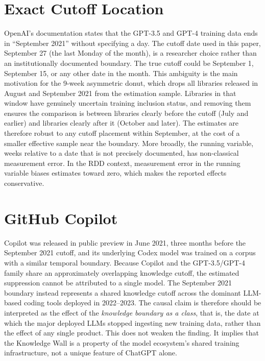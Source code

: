 \documentclass[12pt, a4paper]{report}
\begin{document}
\section*{Exact Cutoff Location}
OpenAI's documentation states that the GPT-3.5 and GPT-4 training data ends in ``September 2021'' without specifying a day. The cutoff date used in this paper, September 27 (the last Monday of the month), is a researcher choice rather than an institutionally documented boundary. The true cutoff could be September 1, September 15, or any other date in the month. This ambiguity is the main motivation for the 9-week asymmetric donut, which drops all libraries released in August and September 2021 from the estimation sample. Libraries in that window have genuinely uncertain training inclusion status, and removing them ensures the comparison is between libraries clearly before the cutoff (July and earlier) and libraries clearly after it (October and later). The estimates are therefore robust to any cutoff placement within September, at the cost of a smaller effective sample near the boundary. More broadly, the running variable, weeks relative to a date that is not precisely documented, has non-classical measurement error. In the RDD context, measurement error in the running variable biases estimates toward zero, which makes the reported effects conservative.

\section*{GitHub Copilot}
Copilot was released in public preview in June 2021, three months before the September 2021 cutoff, and its underlying Codex model was trained on a corpus with a similar temporal boundary. Because Copilot and the GPT-3.5/GPT-4 family share an approximately overlapping knowledge cutoff, the estimated suppression cannot be attributed to a single model. The September 2021 boundary instead represents a shared knowledge cutoff across the dominant LLM-based coding tools deployed in 2022--2023. The causal claim is therefore should be interpreted as the effect of the \textit{knowledge boundary as a class}, that is, the date at which the major deployed LLMs stopped ingesting new training data, rather than the effect of any single product. This does not weaken the finding. It implies that the Knowledge Wall is a property of the model ecosystem's shared training infrastructure, not a unique feature of ChatGPT alone.
\end{document}
